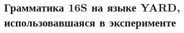 \documentclass[12pt]{article}  %
\theoremstyle{remark}
\begin{document}
\begin{appendices}
\section{Грамматика 16S на языке YARD, использовавшаяся в эксперименте}
\label{grammar}

\end{appendices}
\end{document}
